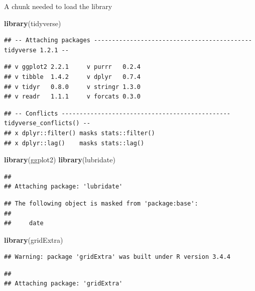 \documentclass[]{article}
\newenvironment{Shaded}{\begin{snugshade}}{\end{snugshade}}
\newcommand{\KeywordTok}[1]{\textcolor[rgb]{0.13,0.29,0.53}{\textbf{#1}}}
\newcommand{\NormalTok}[1]{#1}
\begin{document}
A chunk needed to load the library

\begin{Shaded}
\begin{Highlighting}[]
\KeywordTok{library}\NormalTok{(tidyverse)}
\end{Highlighting}
\end{Shaded}

\begin{verbatim}
## -- Attaching packages -------------------------------------------- tidyverse 1.2.1 --
\end{verbatim}

\begin{verbatim}
## v ggplot2 2.2.1     v purrr   0.2.4
## v tibble  1.4.2     v dplyr   0.7.4
## v tidyr   0.8.0     v stringr 1.3.0
## v readr   1.1.1     v forcats 0.3.0
\end{verbatim}

\begin{verbatim}
## -- Conflicts ----------------------------------------------- tidyverse_conflicts() --
## x dplyr::filter() masks stats::filter()
## x dplyr::lag()    masks stats::lag()
\end{verbatim}

\begin{Shaded}
\begin{Highlighting}[]
\KeywordTok{library}\NormalTok{(ggplot2)}
\KeywordTok{library}\NormalTok{(lubridate)}
\end{Highlighting}
\end{Shaded}

\begin{verbatim}
## 
## Attaching package: 'lubridate'
\end{verbatim}

\begin{verbatim}
## The following object is masked from 'package:base':
## 
##     date
\end{verbatim}

\begin{Shaded}
\begin{Highlighting}[]
\KeywordTok{library}\NormalTok{(gridExtra)}
\end{Highlighting}
\end{Shaded}

\begin{verbatim}
## Warning: package 'gridExtra' was built under R version 3.4.4
\end{verbatim}

\begin{verbatim}
## 
## Attaching package: 'gridExtra'
\end{verbatim}
\end{document}
